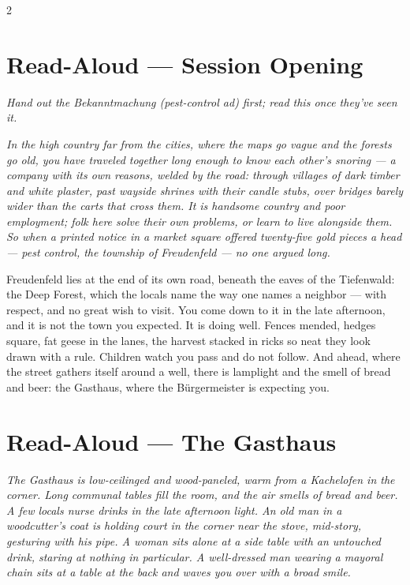 \documentclass[10pt,letterpaper]{article}
\begin{document}
\begin{multicols}{2}

\section*{Read-Aloud --- Session Opening}
\textit{Hand out the Bekanntmachung (pest-control ad) first; read this once they've seen it.}
\begin{readaloud}
\itshape
In the high country far from the cities, where the maps go vague and the forests go old, you have traveled together long enough to know each other's snoring --- a company with its own reasons, welded by the road: through villages of dark timber and white plaster, past wayside shrines with their candle stubs, over bridges barely wider than the carts that cross them. It is handsome country and poor employment; folk here solve their own problems, or learn to live alongside them. So when a printed notice in a market square offered twenty-five gold pieces a head --- pest control, the township of Freudenfeld --- no one argued long.

Freudenfeld lies at the end of its own road, beneath the eaves of the Tiefenwald: the Deep Forest, which the locals name the way one names a neighbor --- with respect, and no great wish to visit. You come down to it in the late afternoon, and it is not the town you expected. It is doing well. Fences mended, hedges square, fat geese in the lanes, the harvest stacked in ricks so neat they look drawn with a rule. Children watch you pass and do not follow. And ahead, where the street gathers itself around a well, there is lamplight and the smell of bread and beer: the Gasthaus, where the Bürgermeister is expecting you.
\end{readaloud}

\section*{Read-Aloud --- The Gasthaus}
\begin{readaloud}
\itshape
The Gasthaus is low-ceilinged and wood-paneled, warm from a Kachelofen in the corner. Long communal tables fill the room, and the air smells of bread and beer. A few locals nurse drinks in the late afternoon light. An old man in a woodcutter's coat is holding court in the corner near the stove, mid-story, gesturing with his pipe. A woman sits alone at a side table with an untouched drink, staring at nothing in particular. A well-dressed man wearing a mayoral chain sits at a table at the back and waves you over with a broad smile.
\end{readaloud}


\end{multicols}
\end{document}
